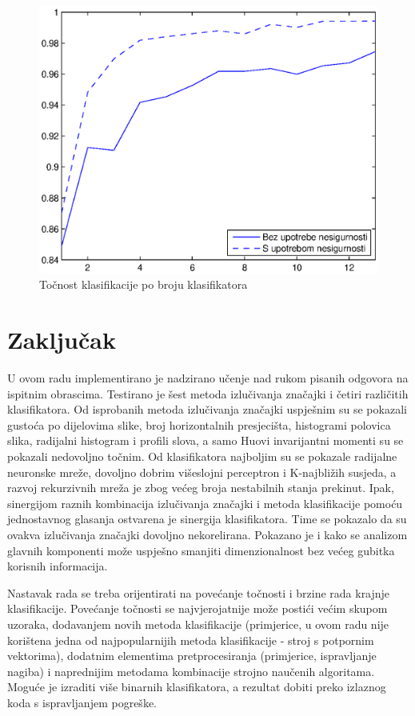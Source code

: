 \documentclass[a4paper,twocolumn,dvipdfm]{article}
\begin{document}
\begin{figure}
\centering
\includegraphics[scale=0.5]{accByClassifCount.eps}
\caption{Točnost klasifikacije po broju klasifikatora}
\label{figure:rezPoBrojuKlas}
\end{figure}


\section{Zaključak}
U ovom radu implementirano je nadzirano učenje nad rukom pisanih odgovora na
ispitnim obrascima. Testirano je šest metoda izlučivanja značajki i četiri
različitih klasifikatora. Od isprobanih metoda izlučivanja značajki uspješnim
su se pokazali gustoća po dijelovima slike, broj horizontalnih presjecišta,
histogrami polovica slika, radijalni histogram i profili slova, a samo Huovi
invarijantni momenti su se pokazali nedovoljno točnim. Od klasifikatora
najboljim su se pokazale radijalne neuronske mreže, dovoljno dobrim višeslojni
perceptron i K-najbližih susjeda, a razvoj rekurzivnih mreža je zbog većeg broja
nestabilnih stanja prekinut. Ipak, sinergijom raznih kombinacija izlučivanja
značajki i metoda klasifikacije pomoću jednostavnog glasanja ostvarena je
sinergija klasifikatora. Time se pokazalo da su ovakva izlučivanja značajki
dovoljno nekorelirana. Pokazano je i kako se analizom glavnih komponenti može
uspješno smanjiti dimenzionalnost bez većeg gubitka korisnih informacija.

Nastavak rada se treba orijentirati na povećanje točnosti i brzine rada krajnje
klasifikacije. Povećanje točnosti se najvjerojatnije može postići većim skupom
uzoraka, dodavanjem novih metoda klasifikacije (primjerice, u ovom radu nije
korištena jedna od najpopularnijih metoda klasifikacije - stroj s potpornim
vektorima), dodatnim elementima pretprocesiranja (primjerice, ispravljanje
nagiba) i naprednijim metodama kombinacije strojno naučenih algoritama. Moguće
je izraditi više binarnih klasifikatora, a rezultat dobiti preko izlaznog koda s
ispravljanjem pogreške.
\end{document}
